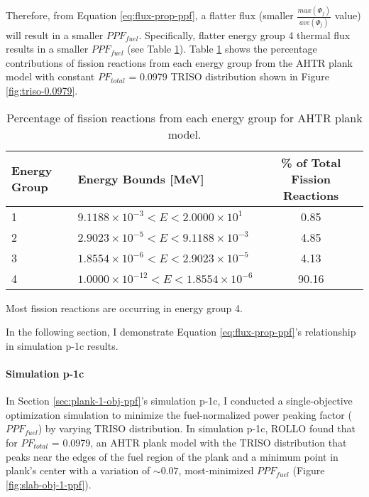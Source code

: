 Therefore, from Equation \ref{eq:flux-prop-ppf}, a flatter flux (smaller 
$\frac{max(\Phi_j)}{ave(\Phi_j)}$ value) will result in a smaller $PPF_{fuel}$. 
Specifically, flatter energy group 4 thermal flux results in a smaller $PPF_{fuel}$
(see Table \ref{tab:fission-flux}). 
Table \ref{tab:fission-flux} shows the percentage contributions of fission reactions from 
each energy group from the \gls{AHTR} plank model with constant $PF_{total}$ = 0.0979 
TRISO distribution shown in Figure \ref{fig:triso-0.0979}. 
\begin{table}[htbp!]
    \centering
    \onehalfspacing
    \caption{Percentage of fission reactions from each energy group for \gls{AHTR} 
    plank model.}
	\label{tab:fission-flux}
    \footnotesize
    \begin{tabular}{llc}
    \hline 
    \textbf{Energy Group} & \textbf{Energy Bounds [MeV]} 
    & \textbf{\% of Total Fission \newline Reactions} \\
    \hline
    1 & $9.1188\times 10^{-3} < E < 2.0000\times 10^1$ & 0.85 \\ 
    2 & $2.9023\times 10^{-5} < E < 9.1188\times 10^{-3}$ & 4.85 \\
    3 & $1.8554\times 10^{-6} < E < 2.9023\times 10^{-5}$ & 4.13 \\
    4 & $1.0000\times 10^{-12} < E < 1.8554\times 10^{-6}$ & 90.16 \\
    \hline
    \end{tabular}
\end{table}
Most fission reactions are occurring in energy group 4. 

In the following section, I demonstrate Equation \ref{eq:flux-prop-ppf}'s relationship 
in simulation p-1c results. 

\paragraph{Simulation p-1c}
In Section \ref{sec:plank-1-obj-ppf}'s simulation p-1c, I conducted a single-objective 
optimization simulation to minimize the fuel-normalized power peaking factor ($PPF_{fuel}$) 
by varying TRISO distribution. 
In simulation p-1c, \gls{ROLLO} found that for $PF_{total}$ = 0.0979, an \gls{AHTR} 
plank model with the TRISO distribution that peaks near the edges of the fuel region of 
the plank and a minimum point in plank's center with a variation of $\sim0.07$, 
most-minimized $PPF_{fuel}$ (Figure \ref{fig:slab-obj-1-ppf}). 


